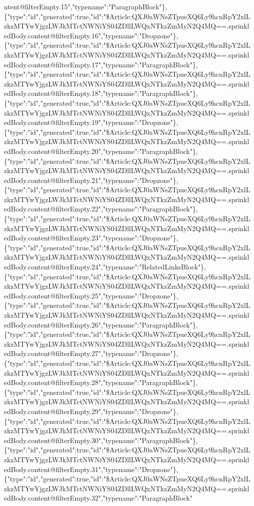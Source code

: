 ntent@filterEmpty.15","typename":"ParagraphBlock"\},\{"type":"id","generated":true,"id":"\$Article:QXJ0aWNsZTpueXQ6Ly9hcnRpY2xlLzkzMTYwYjgzLWJkMTctNWNiYS04ZDllLWQxNTkzZmMyN2Q4MQ==.sprinkledBody.content@filterEmpty.16","typename":"Dropzone"\},\{"type":"id","generated":true,"id":"\$Article:QXJ0aWNsZTpueXQ6Ly9hcnRpY2xlLzkzMTYwYjgzLWJkMTctNWNiYS04ZDllLWQxNTkzZmMyN2Q4MQ==.sprinkledBody.content@filterEmpty.17","typename":"ParagraphBlock"\},\{"type":"id","generated":true,"id":"\$Article:QXJ0aWNsZTpueXQ6Ly9hcnRpY2xlLzkzMTYwYjgzLWJkMTctNWNiYS04ZDllLWQxNTkzZmMyN2Q4MQ==.sprinkledBody.content@filterEmpty.18","typename":"ParagraphBlock"\},\{"type":"id","generated":true,"id":"\$Article:QXJ0aWNsZTpueXQ6Ly9hcnRpY2xlLzkzMTYwYjgzLWJkMTctNWNiYS04ZDllLWQxNTkzZmMyN2Q4MQ==.sprinkledBody.content@filterEmpty.19","typename":"Dropzone"\},\{"type":"id","generated":true,"id":"\$Article:QXJ0aWNsZTpueXQ6Ly9hcnRpY2xlLzkzMTYwYjgzLWJkMTctNWNiYS04ZDllLWQxNTkzZmMyN2Q4MQ==.sprinkledBody.content@filterEmpty.20","typename":"ParagraphBlock"\},\{"type":"id","generated":true,"id":"\$Article:QXJ0aWNsZTpueXQ6Ly9hcnRpY2xlLzkzMTYwYjgzLWJkMTctNWNiYS04ZDllLWQxNTkzZmMyN2Q4MQ==.sprinkledBody.content@filterEmpty.21","typename":"Dropzone"\},\{"type":"id","generated":true,"id":"\$Article:QXJ0aWNsZTpueXQ6Ly9hcnRpY2xlLzkzMTYwYjgzLWJkMTctNWNiYS04ZDllLWQxNTkzZmMyN2Q4MQ==.sprinkledBody.content@filterEmpty.22","typename":"ParagraphBlock"\},\{"type":"id","generated":true,"id":"\$Article:QXJ0aWNsZTpueXQ6Ly9hcnRpY2xlLzkzMTYwYjgzLWJkMTctNWNiYS04ZDllLWQxNTkzZmMyN2Q4MQ==.sprinkledBody.content@filterEmpty.23","typename":"Dropzone"\},\{"type":"id","generated":true,"id":"\$Article:QXJ0aWNsZTpueXQ6Ly9hcnRpY2xlLzkzMTYwYjgzLWJkMTctNWNiYS04ZDllLWQxNTkzZmMyN2Q4MQ==.sprinkledBody.content@filterEmpty.24","typename":"RelatedLinksBlock"\},\{"type":"id","generated":true,"id":"\$Article:QXJ0aWNsZTpueXQ6Ly9hcnRpY2xlLzkzMTYwYjgzLWJkMTctNWNiYS04ZDllLWQxNTkzZmMyN2Q4MQ==.sprinkledBody.content@filterEmpty.25","typename":"Dropzone"\},\{"type":"id","generated":true,"id":"\$Article:QXJ0aWNsZTpueXQ6Ly9hcnRpY2xlLzkzMTYwYjgzLWJkMTctNWNiYS04ZDllLWQxNTkzZmMyN2Q4MQ==.sprinkledBody.content@filterEmpty.26","typename":"ParagraphBlock"\},\{"type":"id","generated":true,"id":"\$Article:QXJ0aWNsZTpueXQ6Ly9hcnRpY2xlLzkzMTYwYjgzLWJkMTctNWNiYS04ZDllLWQxNTkzZmMyN2Q4MQ==.sprinkledBody.content@filterEmpty.27","typename":"Dropzone"\},\{"type":"id","generated":true,"id":"\$Article:QXJ0aWNsZTpueXQ6Ly9hcnRpY2xlLzkzMTYwYjgzLWJkMTctNWNiYS04ZDllLWQxNTkzZmMyN2Q4MQ==.sprinkledBody.content@filterEmpty.28","typename":"ParagraphBlock"\},\{"type":"id","generated":true,"id":"\$Article:QXJ0aWNsZTpueXQ6Ly9hcnRpY2xlLzkzMTYwYjgzLWJkMTctNWNiYS04ZDllLWQxNTkzZmMyN2Q4MQ==.sprinkledBody.content@filterEmpty.29","typename":"Dropzone"\},\{"type":"id","generated":true,"id":"\$Article:QXJ0aWNsZTpueXQ6Ly9hcnRpY2xlLzkzMTYwYjgzLWJkMTctNWNiYS04ZDllLWQxNTkzZmMyN2Q4MQ==.sprinkledBody.content@filterEmpty.30","typename":"ParagraphBlock"\},\{"type":"id","generated":true,"id":"\$Article:QXJ0aWNsZTpueXQ6Ly9hcnRpY2xlLzkzMTYwYjgzLWJkMTctNWNiYS04ZDllLWQxNTkzZmMyN2Q4MQ==.sprinkledBody.content@filterEmpty.31","typename":"Dropzone"\},\{"type":"id","generated":true,"id":"\$Article:QXJ0aWNsZTpueXQ6Ly9hcnRpY2xlLzkzMTYwYjgzLWJkMTctNWNiYS04ZDllLWQxNTkzZmMyN2Q4MQ==.sprinkledBody.content@filterEmpty.32","typename":"ParagraphBlock"